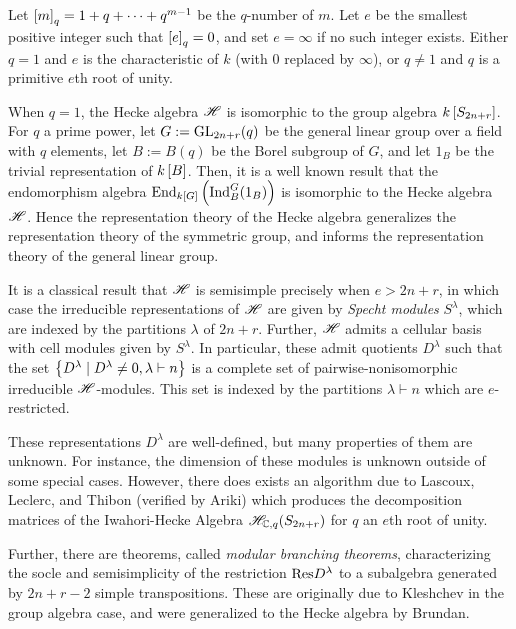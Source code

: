 \documentclass{amsart}
\begin{document}
  Let $\left[ m \right]_q = 1 + q + \dots + q^{m-1}$ be the $q$-number of $m$. 
  Let $e$ be the smallest positive integer such that $\left[ e \right]_q = 0$, and set $e = \infty$ if no such integer exists.
  Either $q = 1$ and $e$ is the characteristic of $k$ (with $0$ replaced by $\infty$), or $q \neq 1$ and $q$ is a primitive $e$th root of unity.

  \vspace{5pt}
  When $q = 1$, the Hecke algebra $\mathscr{H}$ is isomorphic to the group algebra $k\left[ S_{2n+r} \right]$.
  For $q$ a prime power, let $G := \text{GL}_{2n+r}(q)$ be the general linear group over a field with $q$ elements, let $B := B(q)$ be the Borel subgroup of $G$, and let $1_B$ be the trivial representation of $k\left[ B \right]$.
  Then, it is a well known result that the endomorphism algebra $\text{End}_{k\left[ G \right]} \left( \text{Ind}_B^G(1_B) \right)$ is isomorphic to the Hecke algebra $\mathscr{H}$.\cite{Mathas-book}
  Hence the representation theory of the Hecke algebra generalizes the representation theory of the symmetric group, and informs the representation theory of the general linear group. 

  It is a classical result that $\mathscr{H}$ is semisimple precisely when $e > 2n + r$, in which case the irreducible representations of $\mathscr{H}$ are given by \emph{Specht modules} $S^\lambda$, which are indexed by the partitions $\lambda$ of $2n + r$.
  Further, $\mathscr{H}$ admits a cellular basis with cell modules given by $S^\lambda$.
  In particular, these admit quotients $D^\lambda$ such that the set $\left\{ D^\lambda \mid D^\lambda \neq 0, \lambda \vdash n \right\}$ is a complete set of pairwise-nonisomorphic irreducible $\mathscr{H}$-modules.
  This set is indexed by the partitions $\lambda \vdash n$ which are $e$-restricted.\cite{Murphy1,Murphy2}
  
  These representations $D^\lambda$ are well-defined, but many properties of them are unknown.
  For instance, the dimension of these modules is unknown outside of some special cases.\cite{Mathas-book}
  However, there does exists an algorithm due to Lascoux, Leclerc, and Thibon (verified by Ariki) which produces the decomposition matrices of the Iwahori-Hecke Algebra $\mathscr{H}_{\mathbb{C},q}(S_{2n + r})$ for $q$ an $e$th root of unity.\cite{Ariki,LLT}
  
  Further, there are theorems, called \emph{modular branching theorems}, characterizing the socle and semisimplicity of the restriction $\text{Res} D^\lambda$ to a subalgebra generated by $2n + r - 2$ simple transpositions.
  These are originally due to Kleshchev in the group algebra case, and were generalized to the Hecke algebra by Brundan.\cite{Brundan,Kleshchev} 
  
\end{document}

